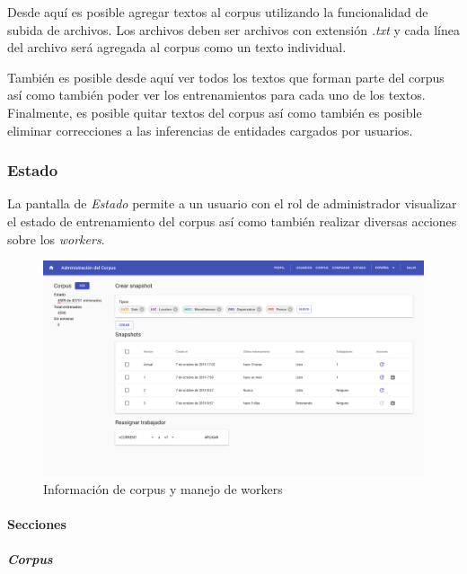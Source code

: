 \documentclass[12pt,a4paper,]{scrartcl}
\let\oldparagraph\paragraph
\renewcommand{\paragraph}[1]{\oldparagraph{#1}\mbox{}}
\let\oldsubparagraph\subparagraph
\renewcommand{\subparagraph}[1]{\oldsubparagraph{#1}\mbox{}}
\begin{document}
Desde aquí es posible agregar textos al corpus utilizando la funcionalidad de subida de archivos. Los archivos deben ser archivos con extensión \emph{.txt} y cada línea del archivo será agregada al corpus como un texto individual.

También es posible desde aquí ver todos los textos que forman parte del corpus así como también poder ver los entrenamientos para cada uno de los textos. Finalmente, es posible quitar textos del corpus así como también es posible eliminar correcciones a las inferencias de entidades cargados por usuarios.

\hypertarget{estado}{%
\subsubsection{Estado}\label{estado}}

La pantalla de \emph{Estado} permite a un usuario con el rol de administrador visualizar el estado de entrenamiento del corpus así como también realizar diversas acciones sobre los \emph{workers}.

\begin{figure}[H]

{\centering \includegraphics{assets/logic/status.pdf} 

}

\caption{Información de corpus y manejo de workers}\label{fig:logic-status}
\end{figure}

\hypertarget{secciones}{%
\paragraph{Secciones}\label{secciones}}

\hypertarget{corpus-1}{%
\subparagraph{Corpus}\label{corpus-1}}
\end{document}
